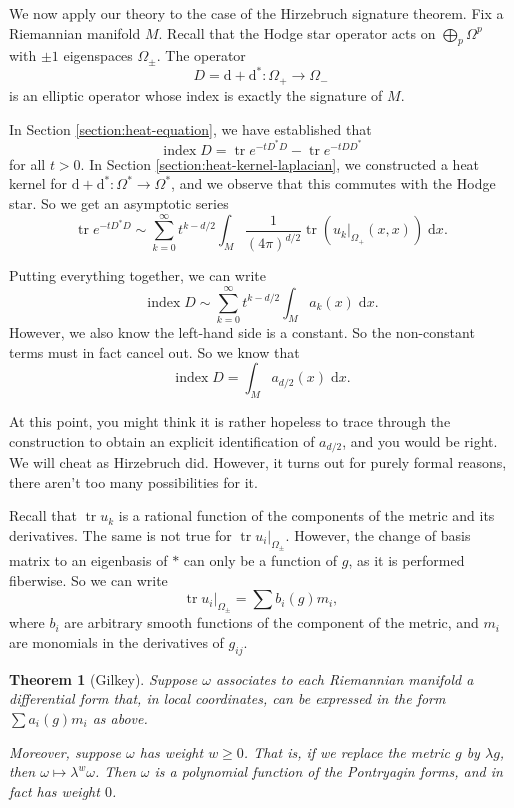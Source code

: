 \documentclass{shortart}
\newtheorem{thm}{Theorem}[section]
\theoremstyle{definition}
\renewcommand\d{\mathrm{d}}
\DeclareMathOperator\idx{index}
\DeclareMathOperator\tr{tr}
\begin{document}
We now apply our theory to the case of the Hirzebruch signature theorem. Fix a Riemannian manifold $M$. Recall that the Hodge star operator acts on $\bigoplus_p \Omega^p$ with $\pm 1$ eigenspaces $\Omega_{\pm}$. The operator
\[
  D = \d + \d^*\colon \Omega_+ \to \Omega_-
\]
is an elliptic operator whose index is exactly  the signature of $M$.

In Section \ref{section:heat-equation}, we have established that
\[
  \idx D = \tr e^{-t D^*D} - \tr e^{-t DD^*}
\]
for all $t > 0$. In Section \ref{section:heat-kernel-laplacian}, we constructed a heat kernel for $\d + \d^*\colon \Omega^* \to \Omega^*$, and we observe that this commutes with the Hodge star. So we get an asymptotic series
\[
  \tr e^{-t D^*D} \sim \sum_{k = 0}^\infty t^{k - d/2}\int_M \frac{1}{(4\pi)^{d/2}} \tr (u_k|_{\Omega_+}(x, x))\;\d x.
\]

Putting everything together, we can write
\[
  \idx D \sim \sum_{k = 0}^\infty t^{k - d/2} \int_M a_k(x) \;\d x.
\]
However, we also know the left-hand side is a constant. So the non-constant terms must in fact cancel out. So we know that
\[
  \idx D = \int_M a_{d/2}(x) \;\d x.
\]

At this point, you might think it is rather hopeless to trace through the construction to obtain an explicit identification of $a_{d/2}$, and you would be right. We will cheat as Hirzebruch did. However, it turns out for purely formal reasons, there aren't too many possibilities for it.

Recall that $\tr u_k$ is a rational function of the components of the metric and its derivatives. The same is not true for $\tr u_i|_{\Omega_{\pm}}$. However, the change of basis matrix to an eigenbasis of $*$ can only be a function of $g$, as it is performed fiberwise. So we can write
\[
  \tr u_i|_{\Omega_{\pm}} = \sum b_i(g) m_i,
\]
where $b_i$ are arbitrary smooth functions of the component of the metric, and $m_i$ are monomials in the derivatives of $g_{ij}$.

\begin{thm}[Gilkey]
  Suppose $\omega$ associates to each Riemannian manifold a differential form that, in local coordinates, can be expressed in the form $\sum a_i(g) m_i$ as above. 

  Moreover, suppose $\omega$ has weight $w \geq 0$. That is, if we replace the metric $g$ by $\lambda g$, then $\omega \mapsto \lambda^w \omega$. Then $\omega$ is a polynomial function of the Pontryagin forms, and in fact has weight $0$.
\end{thm}
\end{document}
